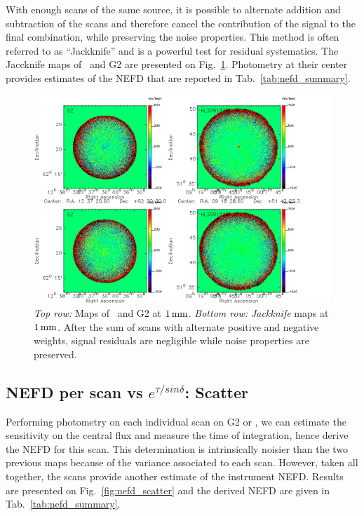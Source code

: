 With enough scans of the same source, it is possible to alternate addition and
subtraction of the scans and therefore cancel the contribution of the signal to
the final combination, while preserving the noise properties. This method is
often referred to as ``Jackknife'' and is a powerful test for residual
systematics. The Jaccknife maps of \hls\ and G2 are presented on
Fig.~\ref{fig:jk_maps}. Photometry at their center provides estimates of the
 NEFD that are reported in Tab.~\ref{tab:nefd_summary}.

\begin{figure}[!thbp]
\begin{center}
\includegraphics[clip, angle=0, scale=0.5]{Figures/nefd_jackknife.png}
\caption[Jackknife maps of G2 and \hls]{\emph{Top row:} Maps of \hls\ and G2 at
  $1\,\rm{mm}$. \emph{Bottom row:} \emph{Jackknife} maps at
  $1\,\rm{mm}$. After the sum of scans with alternate positive and negative
  weights, signal residuals are negligible while noise properties are preserved.}
\label{fig:jk_maps}
\end{center}
\end{figure}


\subsection{NEFD per scan vs $e^{\tau/sin\delta}$: Scatter}
\label{se:nefd_scatter}

Performing photometry on each individual scan on G2 or \hls, we can estimate the
sensitivity on the central flux and measure the time of integration, hence
derive the NEFD for this scan. This determination is intrinsically noisier than
the two previous maps because of the variance associated to each scan. However,
taken all together, the scans provide another estimate of the instrument
NEFD. Results are presented on Fig.~\ref{fig:nefd_scatter} and the derived
 NEFD are given in Tab.~\ref{tab:nefd_summary}.

